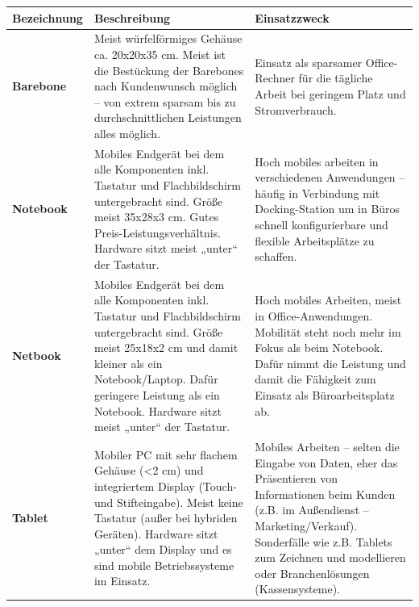 \documentclass[10pt]{article}
\begin{document}
\begin{flushleft}
\begin{longtable}{|p{}|p{}|p{}|}

        \hline
        \textbf{Bezeichnung} & \textbf{Beschreibung} & \textbf{Einsatzzweck}\\\hline
        \textbf{Barebone} & Meist würfelförmiges Gehäuse ca. 20x20x35 cm.
        Meist ist die Bestückung der Barebones nach Kundenwunsch 
        möglich – von extrem sparsam bis zu durchschnittlichen 
        Leistungen alles möglich. & Einsatz als sparsamer Office-Rechner für die tägliche Arbeit bei geringem Platz und Stromverbrauch.\\\hline
        
        \textbf{Notebook} & Mobiles Endgerät bei dem alle Komponenten inkl. Tastatur und Flachbildschirm untergebracht sind. Größe meist 35x28x3 cm. \newline Gutes Preis-Leistungsverhältnis. \newline Hardware sitzt meist „unter“ der Tastatur. & Hoch mobiles arbeiten in verschiedenen Anwendungen – häufig in Verbindung mit Docking-Station um in Büros schnell konfigurierbare und flexible Arbeitsplätze zu schaffen. \\\hline
        
        \textbf{Netbook} & Mobiles Endgerät bei dem alle Komponenten inkl. Tastatur und Flachbildschirm untergebracht sind. Größe meist 25x18x2 cm und damit kleiner als ein Notebook/Laptop. Dafür geringere Leistung als ein Notebook. \newline Hardware sitzt meist „unter“ der Tastatur. & Hoch mobiles Arbeiten, meist in Office-Anwendungen. Mobilität steht noch mehr im Fokus als beim Notebook. Dafür nimmt die Leistung und damit die Fähigkeit zum Einsatz als Büroarbeitsplatz ab. \\\hline

        \textbf{Tablet} & Mobiler PC mit sehr flachem Gehäuse (<2 cm) und integriertem Display (Touch- und Stifteingabe). Meist keine Tastatur (außer bei hybriden Geräten). \newline Hardware sitzt „unter“ dem Display und es sind mobile Betriebssysteme im Einsatz. & Mobiles Arbeiten – selten die Eingabe von Daten, eher das Präsentieren von Informationen beim Kunden (z.B. im Außendienst – Marketing/Verkauf). \newline Sonderfälle wie z.B. Tablets zum Zeichnen und modellieren oder Branchenlösungen (Kassensysteme). \\\hline


\end{longtable}
\end{flushleft}
\end{document}
